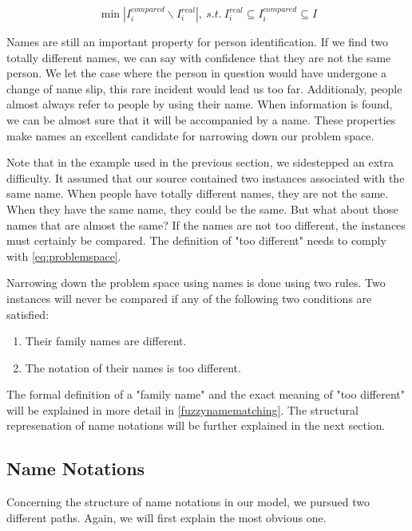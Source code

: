 \begin{equation}
\min |I^{compared}_i\backslash I^{real}_i|,\ s.t.\ I^{real}_i \subseteq I^{compared}_i \subseteq I
\label{eq:problemspace}
\end{equation}

Names are still an important property for person identification. If we find two totally different names, we can say with confidence that they are not the same person. We let the case where the person in question would have undergone a change of name slip, this rare incident would lead us too far. Additionaly, people almost always refer to people by using their name. When information is found, we can be almost sure that it will be accompanied by a name. These properties make names an excellent candidate for narrowing down our problem space.

Note that in the example used in the previous section, we sidestepped an extra difficulty. It assumed that our source contained two instances associated with the same name. When people have totally different names, they are not the same. When they have the same name, they could be the same. But what about those names that are almost the same? If the names are not too different, the instances must certainly be compared. The definition of "too different" needs to comply with \autoref{eq:problemspace}.

Narrowing down the problem space using names is done using two rules. Two instances will never be compared if any of the following two conditions are satisfied:

\begin{enumerate}
\item Their family names are different.
\item The notation of their names is too different.
\end{enumerate}

The formal definition of a "family name" and the exact meaning of "too different" will be explained in more detail in \autoref{fuzzynamematching}. The structural represenation of name notations will be further explained in the next section.

\subsection{Name Notations}

Concerning the structure of name notations in our model, we pursued two different paths. Again, we will first explain the most obvious one. 

